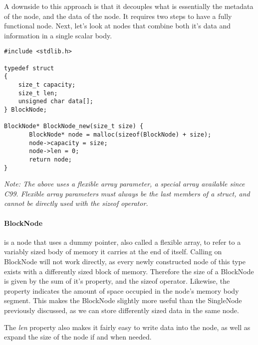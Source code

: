 \par A downside to this approach is that it decouples what is essentially the metadata of the node, and the data of the node. It requires two steps to have a fully functional node. Next, let's look at nodes that combine both it's data and information in a single scalar body. \\

\begin{lstlisting}[style=numc]
#include <stdlib.h>

typedef struct
{
    size_t capacity;
    size_t len;
    unsigned char data[];
} BlockNode;

BlockNode* BlockNode_new(size_t size) {
       BlockNode* node = malloc(sizeof(BlockNode) + size);
       node->capacity = size;
       node->len = 0;
       return node;
}
\end{lstlisting}

\emph{Note: The above uses a flexible array parameter, a special array available since C99. Flexible array parameters must always be the last members of a struct, and cannot be directly used with the sizeof operator.}

\paragraph{BlockNode} is a node that uses a dummy pointer, also called a flexible array,  to refer to a variably sized body of memory it carries at the end of itself. Calling  on BlockNode will not work directly, as every newly constructed node of this type exists with a differently sized block of memory. Therefore the size of a BlockNode is given by the sum of it's  property, and the sizeof operator. Likewise, the  property indicates the amount of space occupied in the node's memory body segment. This makes the BlockNode slightly more useful than the SingleNode previously discussed, as we can store differently sized data in the same node.

\par The \emph{len} property also makes it fairly easy to write data into the node, as well as expand the size of the node if and when needed.

